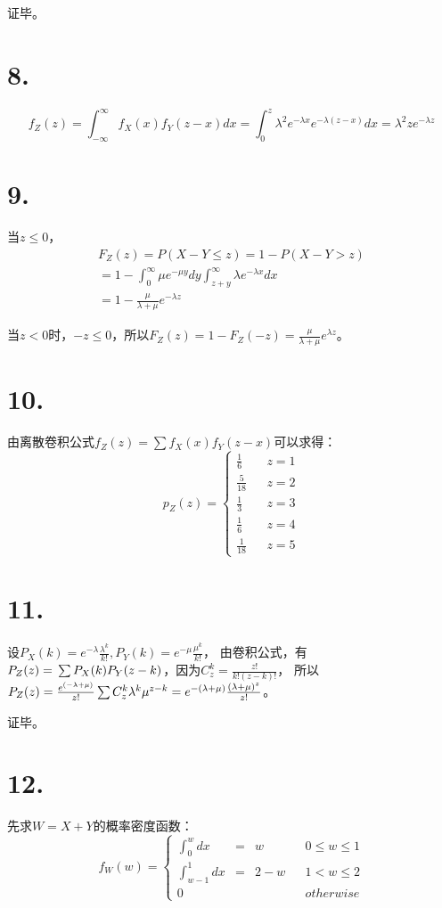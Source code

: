 \documentclass[UTF8]{report}
\begin{document}
        证毕。
    \section*{8.}
        $$f_Z(z) = \int_{-\infty}^{\infty}f_X(x)f_Y(z - x)dx = \int_{0}^{z}\lambda^2e^{-\lambda x}e^{-\lambda (z - x)}dx = \lambda^2ze^{-\lambda z}$$
    \section*{9.}
        当$z \leq 0$，
        $$\begin{array}{l}
            F_Z(z) = P(X - Y \leq z) = 1 - P(X - Y > z)\\
            = 1 - \int_{0}^{\infty}\mu e^{-\mu y}dy\int_{z + y}^{\infty}\lambda e^{-\lambda x}dx\\
            = 1 - \frac{\mu}{\lambda + \mu}e^{-\lambda z}
        \end{array}$$

        当$z < 0$时，$-z \leq 0$，所以$F_Z(z) = 1 - F_Z(-z) = \frac{\mu}{\lambda + \mu}e^{\lambda z}$。
    \section*{10.}
        由离散卷积公式$f_Z(z) = \sum f_X(x)f_Y(z - x)$可以求得：
        $$p_Z(z) = \left\{
            \begin{array}{lcr}
                \frac{1}{6} & & z = 1\\
                \frac{5}{18} & & z = 2\\
                \frac{1}{3} & & z = 3\\
                \frac{1}{6} & & z = 4\\
                \frac{1}{18} & & z = 5
            \end{array}
        \right.$$
    \section*{11.}
        设$P_X(k) = e^{-\lambda}\frac{\lambda^k}{k!}, P_Y(k) = e^{-\mu}\frac{\mu^k}{k!}$，
        由卷积公式，有$P_Z(z) =\\ \sum P_X(k)P_Y(z - k)$，因为$C_z^k = \frac{z!}{k!(z - k)!}$，
        所以$P_Z(z) = \frac{e^{(-\lambda + \mu)}}{z!}\sum C_z^k \lambda^k \mu^{z - k}\\ = e^{-(\lambda + \mu)}\frac{(\lambda + \mu)^z}{z!}$。

        证毕。
    \section*{12.}
        先求$W = X + Y$的概率密度函数：
        $$f_W(w) = \left\{
            \begin{array}{llccr}
                \int_{0}^{w}dx & = & w & & 0 \leq w \leq 1\\
                \int_{w - 1}^{1}dx & = & 2 - w & & 1 < w \leq 2\\
                0 & & & & otherwise
            \end{array}
        \right.$$
\end{document}
